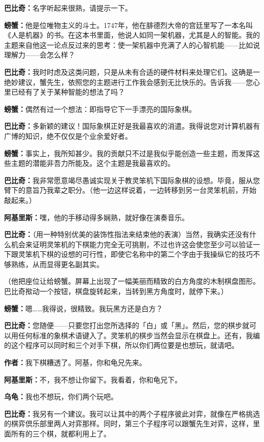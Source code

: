 \documentclass[
  12pt,
  twoside,
  openright,
  oldfontcommands,
]{memoir}
\newcommand{\kaitismall}[1]{{\kaitifamily\small #1}}
\newcommand{\dialogname}[1]{{\heifamily\bfseries #1}}
\begin{document}
\dialogname{巴比奇：}名字听起来很熟，请提示一下。

\dialogname{螃蟹：}他是位唯物主义的斗士。1747年，他在腓德烈大帝的宫廷里写了一本名叫《人是机器》的书。在这本书里面，他说人如同一架机器，尤其是人的智能。我的主题来自他这一论点反过来的思考：使一架机器中充满了人的心智机能------比如说理解力------会怎么样？

\dialogname{巴比奇：}我时时虑及这类问题，只是从未有合适的硬件材料来处理它们。这确是一绝妙建议，蟹先生，依照您的主题进行工作我会感到无比快乐的。告诉我------您心里已经有了关于某种智能的想法了吗？

\dialogname{螃蟹：}偶然有过一个想法：即指导它下一手漂亮的国际象棋。

\dialogname{巴比奇：}多新颖的建议！国际象棋正好是我最喜欢的消遣。我得说您对计算机器有广博的知识，绝不仅仅是个业余爱好者。

\dialogname{螃蟹：}事实上，我所知甚少。我的贡献只不过是我似乎能创造一些主题，而发挥这些主题的潜能非吾力所能及。这个主题是我最喜欢的。

\dialogname{巴比奇：}我非常愿意竭尽愚诚实现关于教灵笨机下国际象棋的设想。毕竟，服从您臂下的意旨乃我辈之职分。\kaitismall{（他一边这样说着，一边转移到另一台灵笨机前，开始敲起来。）}

\dialogname{阿基里斯：}嘿，他的手移动得多娴熟，就好像在演奏音乐。

\dialogname{巴比奇：}\kaitismall{（用一种特别优美的装饰性指法来结束他的表演）}当然，我确实还没有什么机会来证明灵笨机的下棋能力完全无可挑剔，不过也许这会使您至少可以验证一下跟灵笨机下棋的设想的可行性，即使它名称中的第二个字由于我操纵它的技巧不够熟练，从而显得更名副其实。

（他把座位让给螃蟹。屏幕上出现了一幅美丽而精致的白方角度的木制棋盘图形。巴比奇揿动一个按钮，棋盘旋转起来，当转到黑方角度时，就停下来。）

\dialogname{螃蟹：}嗯\ldots\ldots 我得说，很精致。我玩黑方还是白方？

\dialogname{巴比奇：}您随便------只要您打出您所选择的「白」或「黑」。然后，您的棋步就可以用任何标准的象棋术语键入了。灵笨机的棋步当然会显示在棋盘上。还有，我编的这个程序可以同时和三个对手下棋，所以你们两位要是也想玩，就请吧。

\dialogname{作者：}我下棋糟透了。阿基，你和龟兄先来。

\dialogname{阿基里斯：}不，我不想让你留下。我看着，你和龟兄下。

\dialogname{乌龟：}我也不想玩，你们两个玩吧。

\dialogname{巴比奇：}我另有一个建议。我可以让其中的两个子程序彼此对弈，就像在严格挑选的棋弈倶乐部里两人对弈那样。同时，第三个子程序可以跟蟹先生对弈，这样，里面所有的三个棋，就都利用上了。
\end{document}
